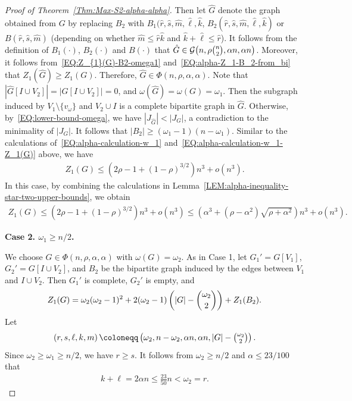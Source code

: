 \documentclass[11pt,a4paper]{article}
\begin{document}
\begin{proof}[Proof of Theorem~\ref{Thm:Max-S2-alpha-alpha}]
Then let $\hat{G}$ denote the graph obtained from $G$ by replacing $B_2$ with $B_1(\hat{r},\hat{s},\hat{m},\hat{\ell},\hat{k}$, $B_2(\hat{r},\hat{s},\hat{m},\hat{\ell},\hat{k})$ or $B(\hat{r},\hat{s},\hat{m})$ (depending on whether $\hat{m} \le \hat{r}\hat{k}$ and $\hat{k} + \hat{\ell} \le \hat{r}$). 
It follows from the definition of $B_1(\cdot)$, $B_2(\cdot)$ and $B(\cdot)$ that $\hat{G} \in \mathcal{G}\big(n,\rho \tbinom{n}{2}, \alpha n, \alpha n \big)$. 
Moreover, it follows from~\eqref{EQ:Z_{1}(G)-B2-omega1} and~\eqref{EQ:alpha-Z_1-B_2-from_bi} that $Z_{1}(\hat{G}) \ge Z_{1}(G)$. 
Therefore, $\hat{G} \in \Phi(n, \rho, \alpha, \alpha)$. 
Note that $\left|\hat{G}[I \cup V_2]\right| = \left|G[I \cup V_2]\right| = 0$, and $\omega(\hat{G}) = \omega(G) = \omega_1$. 
Then the subgraph induced by $V_1 \setminus \{v_{\omega}\}$ and $V_2 \cup I$ is a complete bipartite graph in $\hat{G}$. 
Otherwise, by~\eqref{EQ:lower-bound-omega}, we have $|J_{\hat{G}}| < |J_{G}|$, a contradiction to the minimality of $|J_{G}|$. 
It follows that $|B_2| \ge (\omega_1 -1)(n - \omega_1)$. 
Similar to the calculations of~\eqref{EQ:alpha-calculation-w_1} and~\eqref{EQ:alpha-calculation-w_1-Z_1(G)} above, we have 
\begin{align*}
Z_{1}(G) \le \left(2\rho -1 +(1-\rho)^{3/2}\right)n^3 + o(n^3). 
\end{align*}
In this case, by combining the calculations in Lemma~\ref{LEM:alpha-inequality-star-two-upper-bounds}, we obtain 
\begin{align*}
Z_{1}(G) 
\le \left(2\rho -1 +(1-\rho)^{3/2}\right)n^3 + o(n^3)
\le \left(\alpha^3+(\rho-\alpha^2) \sqrt{\rho+\alpha^2}\right) n^3 + o(n^3). 
\end{align*}

\textbf{Case 2. $\omega_1 \ge n/2$. } 

We choose $G \in \Phi(n, \rho, \alpha, \alpha)$  with $\omega(G) = \omega_2$. 
As in Case 1, let $G_1' = G[V_1]$, $G_2' = G[I\cup V_2]$, and $B_2$ be the bipartite graph induced by the edges between $V_1$ and $I\cup V_2$. 
Then $G_1'$ is complete, $G_2'$ is empty, and 
\begin{align}\label{EQ:Z_{1}(G)-B2-omega2}
Z_{1}(G) = \omega_2 (\omega_2 -1)^2 + 2(\omega_2 -1) \left(|G| - \binom{\omega_2}{2}\right) + Z_{1}(B_2). 
\end{align} 
Let 
\begin{align*}
\left(r,s,\ell,k,m\right) 
\coloneqq \left(\omega_2, n -\omega_2, \alpha n, \alpha n, |G|- \tbinom{\omega_2}{2}\right). 
\end{align*}
Since $\omega_2 \ge \omega_1 \ge n/2$, we have $r \ge s$. 
It follows from $\omega_2 \ge n/2$ and $\alpha \le 23/100$ that 
\begin{align*}
k + \ell 
= 2 \alpha n 
\le \frac{23}{50}n 
< \omega_2
= r. 
\end{align*}


\end{proof}
\end{document}
